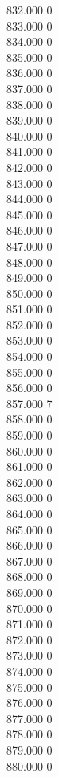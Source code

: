 { 832.000	0 \\
 833.000	0 \\
 834.000	0 \\
 835.000	0 \\
 836.000	0 \\
 837.000	0 \\
 838.000	0 \\
 839.000	0 \\
 840.000	0 \\
 841.000	0 \\
 842.000	0 \\
 843.000	0 \\
 844.000	0 \\
 845.000	0 \\
 846.000	0 \\
 847.000	0 \\
 848.000	0 \\
 849.000	0 \\
 850.000	0 \\
 851.000	0 \\
 852.000	0 \\
 853.000	0 \\
 854.000	0 \\
 855.000	0 \\
 856.000	0 \\
 857.000	7 \\
 858.000	0 \\
 859.000	0 \\
 860.000	0 \\
 861.000	0 \\
 862.000	0 \\
 863.000	0 \\
 864.000	0 \\
 865.000	0 \\
 866.000	0 \\
 867.000	0 \\
 868.000	0 \\
 869.000	0 \\
 870.000	0 \\
 871.000	0 \\
 872.000	0 \\
 873.000	0 \\
 874.000	0 \\
 875.000	0 \\
 876.000	0 \\
 877.000	0 \\
 878.000	0 \\
 879.000	0 \\
 880.000	0 \\
}
